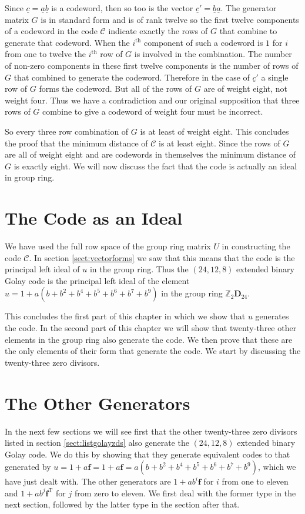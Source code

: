 Since $\underline{c} = \underline{a} \underline{b}$ is a codeword, then so too is the vector $\underline{c}' = \underline{b}\underline{a}$.
The generator matrix $G$ is in standard form and is of rank twelve so the first twelve components of a codeword in the code $\mathcal{C}$ indicate exactly the rows of $G$ that combine to generate that codeword.
When the $i^{\textrm{th}}$ component of such a codeword is $1$ for $i$ from one to twelve the $i^{\textrm{th}}$ row of $G$ is involved in the combination.
The number of non-zero components in these first twelve components is the number of rows of $G$ that combined to generate the codeword.
Therefore in the case of $\underline{c}'$ a single row of $G$ forms the codeword.
But all of the rows of $G$ are of weight eight, not weight four.
Thus we have a contradiction and our original supposition that three rows of $G$ combine to give a codeword of weight four must be incorrect.

So every three row combination of $G$ is at least of weight eight.
This concludes the proof that the minimum distance of $\mathcal{C}$ is at least eight.
Since the rows of $G$ are all of weight eight and are codewords in themselves the minimum distance of $G$ is exactly eight.
We will now discuss the fact that the code is actually an ideal in group ring.

\section{The Code as an Ideal}
We have used the full row space of the group ring matrix $U$ in constructing the code $\mathcal{C}$.
In section \ref{sect:vectorforms} we saw that this means that the code is the principal left ideal of $u$ in the group ring.
Thus the $(24,12,8)$ extended binary Golay code is the principal left ideal of the element $u = 1 + a(b + b^2 + b^4 + b^5 + b^6 + b^7 + b^9)$ in the group ring $\mathbb{Z}_2 \mathbf{D}_{24}$.

This concludes the first part of this chapter in which we show that $u$ generates the code.
In the second part of this chapter we will show that twenty-three other elements in the group ring also generate the code.
We then prove that these are the only elements of their form that generate the code.
We start by discussing the twenty-three zero divisors.

\section{The Other Generators}
\label{sect:othergens}
In the next few sections we will see first that the other twenty-three zero divisors listed in section \ref{sect:listgolayzds} also generate the $(24,12,8)$ extended binary Golay code.
We do this by showing that they generate equivalent codes to that generated by $u = 1 + a \mathbf{f} = 1 + a \mathbf{f} = a(b + b^2 + b^4 + b^5 + b^6 + b^7 + b^9)$, which we have just dealt with.
The other generators are $1+a b^i \mathbf{f}$ for $i$ from one to eleven and $1+a b^j \mathbf{f}^{\textrm{T}}$ for $j$ from zero to eleven.
We first deal with the former type in the next section, followed by the latter type in the section after that.


